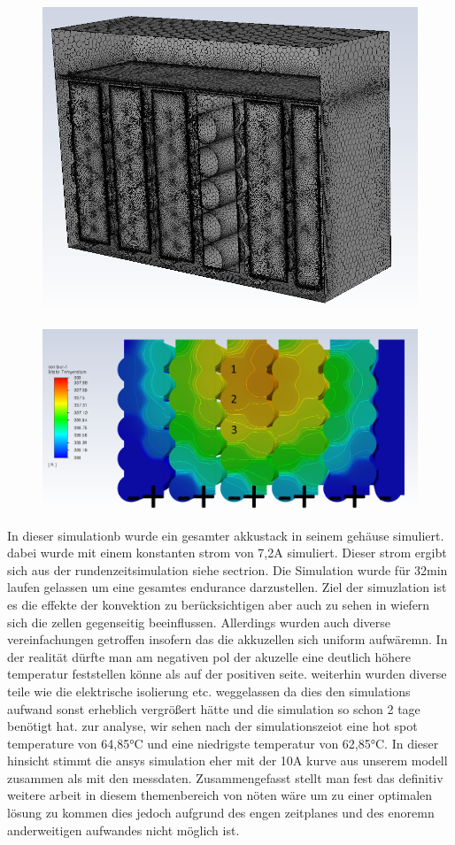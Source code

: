 \begin{figure}
	\centering
	\includegraphics[width=0.7\linewidth]{bilder/Accu_Sim_therm_7_2A_45min_simple_mesh}
	\caption{}
	\label{fig:accusimtherm72a45minsimplemesh}
\end{figure}

\begin{figure}
	\centering
	\includegraphics[width=0.7\linewidth]{bilder/Accu_Sim_therm_7_2A_45min_simple}
	\caption{}
	\label{fig:accusimtherm72a45minsimple}
\end{figure}

In dieser simulationb wurde ein gesamter akkustack in seinem gehäuse simuliert. dabei wurde mit einem konstanten strom von 7,2A simuliert. Dieser strom ergibt sich aus der rundenzeitsimulation siehe sectrion. Die Simulation wurde für 32min laufen gelassen um eine gesamtes endurance darzustellen. Ziel der simuzlation ist es die effekte der konvektion zu berücksichtigen aber auch zu sehen in wiefern sich die zellen gegenseitig beeinflussen. Allerdings wurden auch diverse vereinfachungen getroffen insofern das die akkuzellen sich uniform aufwäremn. In der realität dürfte man am negativen pol der akuzelle eine deutlich höhere temperatur feststellen könne als auf der positiven seite. weiterhin wurden diverse teile wie die elektrische isolierung etc. weggelassen da dies den simulations aufwand sonst erheblich vergrößert hätte und die simulation so schon 2 tage benötigt hat. zur analyse, wir sehen nach der simulationszeiot eine hot spot temperature von 64,85°C und eine niedrigste temperatur von 62,85°C. In dieser hinsicht stimmt die ansys simulation eher mit der 10A kurve aus unserem modell zusammen als mit den messdaten. Zusammengefasst stellt man fest das definitiv weitere arbeit in diesem themenbereich von nöten wäre um zu einer optimalen lösung zu kommen dies jedoch aufgrund des engen zeitplanes und des enoremn anderweitigen aufwandes nicht möglich ist.

